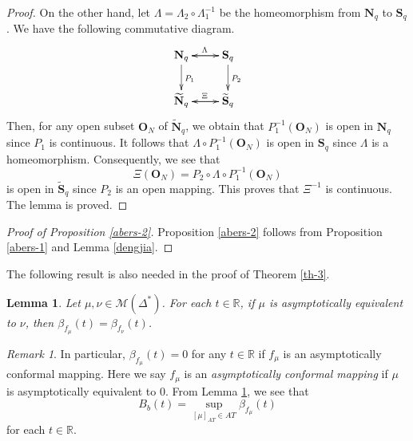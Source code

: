 \documentclass[11pt]{amsart}
\newtheorem{lemma}[theorem]{Lemma}
\theoremstyle{remark}
\newtheorem{remark}[theorem]{Remark}
\theoremstyle{claim}
\theoremstyle{definition}
\theoremstyle{problem}
\theoremstyle{conjecture}
\theoremstyle{question}
\numberwithin{equation}{section}
\begin{document}
\begin{proof}
On the other hand, let $\Lambda=\Lambda_2\circ \Lambda_1^{-1}$ be the homeomorphism from $\mathbf{N}_q$ to $\mathbf{S}_q$. We have the following commutative diagram. 
\begin{displaymath}
    \xymatrix{
        \mathbf{N}_q \ar[r]^{\Lambda} \ar[d]^{P_1} & \mathbf{S}_q \ar[l]  \ar[d]^{P_2} \\
        \widetilde{\mathbf{N}}_q \ar[r]^{\Xi} &        \widetilde{\mathbf{S}}_q  \ar[l]
    }
\end{displaymath}
Then, for any open subset $\mathbf{O}_N$ of $\widetilde{\mathbf{N}}_q$, we obtain that $P_1^{-1}(\mathbf{O}_N)$ is open in  $\mathbf{N}_q$ since $P_1$ is continuous. 
It follows that $\Lambda \circ P_1^{-1}(\mathbf{O}_N)$ is open in $\mathbf{S}_q$ since $\Lambda$ is a homeomorphism. 
Consequently, we see that 
$$\Xi(\mathbf{O}_N)=P_2\circ \Lambda \circ P_1^{-1}(\mathbf{O}_N)$$ is open in $\widetilde{\mathbf{S}}_q$ since $P_2$ is an open mapping. This proves that $\Xi^{-1}$ is continuous.  The lemma is proved. \end{proof}

\begin{proof}[Proof of Proposition \ref{abers-2}]
Proposition \ref{abers-2} follows from Proposition \ref{abers-1} and Lemma \ref{dengjia}.
\end{proof}

The following result is also needed in the proof of Theorem \ref{th-3}.
\begin{lemma}\label{well}
Let $\mu, \nu \in \mathcal{M}({\Delta}^{*})$. For each $t\in \mathbb{R}$, if $\mu$ is asymptotically equivalent to $\nu$, then $\beta_{f_{\mu}}(t)=\beta_{f_{\nu}}(t)$.
\end{lemma}

\begin{remark}
In particular, $\beta_{f_{\mu}}(t)=0$ for any  $t\in\mathbb{R}$ if $f_{\mu}$ is an asymptotically conformal mapping. Here we say $f_{\mu}$ is an {\em asymptotically conformal mapping} if $\mu$ is  asymptotically equivalent to $0$. From Lemma \ref{well}, we see that $$B_{b}(t)=\sup\limits_{[\mu]_{AT}\in AT}\beta_{f_{\mu}}(t)$$ for each $t\in \mathbb{R}$.
\end{remark}
\end{document}
